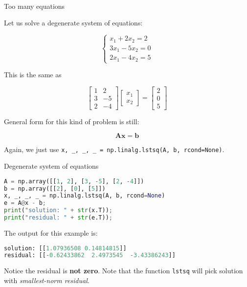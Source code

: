 \documentclass{beamer}
\begin{document}
\begin{frame}{Too many equations}
	\begin{flushleft}

Let us solve a degenerate system of equations:

\begin{equation}
	\begin{cases}
		x_1   + 2 x_2 = 2 \\
		3 x_1   - 5 x_2 = 0  \\
		2 x_1   - 4 x_2 = 5
	\end{cases}
\end{equation}

This is the same as

\begin{equation}
	\begin{bmatrix}
		1   &  2 \\
		3   & -5 \\ 
		2   & -4
	\end{bmatrix}
	\begin{bmatrix}
		x_1  \\
		x_2 
	\end{bmatrix}
	=
	\begin{bmatrix}
		2 \\ 0 \\ 5
	\end{bmatrix}
\end{equation}

General form for this kind of problem is still:

\begin{equation}
	\mathbf{A} \mathbf{x} = \mathbf{b}
\end{equation}

Again, we just use \texttt{x, \_, \_, \_ = np.linalg.lstsq(A, b, rcond=None)}. 		
		
	\end{flushleft}
\end{frame}





\begin{frame}[fragile]{Degenerate system of equations}
	\begin{flushleft}
		
\begin{lstlisting}[language=Python]
A = np.array([[1, 2], [3, -5], [2, -4]])
b = np.array([[2], [0], [5]])
x, _, _, _ = np.linalg.lstsq(A, b, rcond=None)
e = A@x - b;
print("solution: " + str(x.T));
print("residual: " + str(e.T));
\end{lstlisting}		
%
The output for this example is:		
%
\begin{lstlisting}[language=Python]
solution: [[1.07936508 0.14814815]]
residual: [[-0.62433862  2.4973545  -3.43386243]]
\end{lstlisting}			
%
Notice the residual is \textbf{not zero}. Note that the function \texttt{lstsq} will pick solution with \emph{smallest-norm residual}.
		
	\end{flushleft}
\end{frame}
\end{document}
